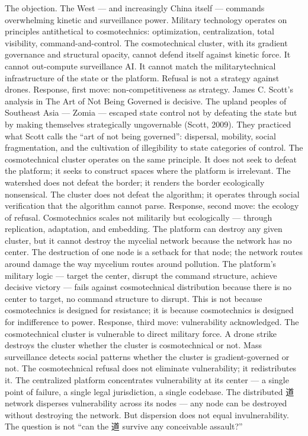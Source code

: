 The objection. The West — and increasingly China itself — commands overwhelming kinetic and surveillance power. Military technology operates on principles antithetical to cosmotechnics: optimization, centralization, total visibility, command-and-control. The cosmotechnical cluster, with its gradient governance and structural opacity, cannot defend itself against kinetic force. It cannot out-compute surveillance AI. It cannot match the militarytechnical infrastructure of the state or the platform. Refusal is not a strategy against drones. Response, first move: non-competitiveness as strategy. James C. Scott’s analysis in The Art of Not Being Governed is decisive. The upland peoples of Southeast Asia — Zomia — escaped state control not by defeating the state but by making themselves strategically ungovernable (Scott, 2009). They practiced what Scott calls the “art of not being governed”: dispersal, mobility, social fragmentation, and the cultivation of illegibility to state categories of control. The cosmotechnical cluster operates on the same principle. It does not seek to defeat the platform; it seeks to construct spaces where the platform is irrelevant. The watershed does not defeat the border; it renders the border ecologically nonsensical. The cluster does not defeat the algorithm; it operates through social verification that the algorithm cannot parse. Response, second move: the ecology of refusal. Cosmotechnics scales not militarily but ecologically — through replication, adaptation, and embedding. The platform can destroy any given cluster, but it cannot destroy the mycelial network because the network has no center. The destruction of one node is a setback for that node; the network routes around damage the way mycelium routes around pollution. The platform’s military logic — target the center, disrupt the command structure, achieve decisive victory — fails against cosmotechnical distribution because there is no center to target, no command structure to disrupt. This is not because cosmotechnics is designed for resistance; it is because cosmotechnics is designed for indifference to power. Response, third move: vulnerability acknowledged. The cosmotechnical cluster is vulnerable to direct military force. A drone strike destroys the cluster whether the cluster is cosmotechnical or not. Mass surveillance detects social patterns whether the cluster is gradient-governed or not. The cosmotechnical refusal does not eliminate vulnerability; it redistributes it. The centralized platform concentrates vulnerability at its center — a single point of failure, a single legal jurisdiction, a single codebase. The distributed 道 network disperses vulnerability across its nodes — any node can be destroyed without destroying the network. But dispersion does not equal invulnerability. The question is not “can the 道 survive any conceivable assault?”

